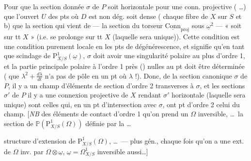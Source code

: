 \documentclass[11pt,a4paper]{article}
\begin{document}
Pour que la section donnée $\sigma$ de $P$ soit horizontale pour une conn. projective   ( \ldots) que l'ouvert $U$ des pts où $D$ est non dég. soit dense ( chaque fibre de $X$ sur $S$ et b) que la section qui vient de   \struck{\ill{}} --- la section \uncertain{\ill{}} du torseur $\underline{\mathrm{Conn}}_{\mathrm{proj}}$ sous $\underline{\omega}^2$ --- \struck{\ill{}} « soit  sur tt $X$ » (i.e. se prolonge  sur tt $X$ (laquelle sera unique)). Cette condition est une condition purement locale en les pts de  \add{\uncertain{\ill{}}} dégénérescence, et signifie qu'en tant que \struck{\ill{}} scindage de $\mathrm{P}^1_{X/S}(\underline{\omega})$, $\sigma$ \struck{\ill{}} doit avoir une singularité polaire au plus d'ordre 1, et la partie   principale polaire à l'ordre 1 près (\uncertain{\ill{}}) \uncertain{\ill{}}  nulles au pt  doit être déterminée ( que $\lambda^2 + \frac{d\lambda}{dt}$ n'a pas de pôle en un pt où $\lambda$ \struck{\ill{}}  !). Donc,   de la section canonique $\sigma$ de $P$, il y a un champ d'éléments de section d'ordre 2 transverses à $\sigma$, et les sections $\sigma'$ de $P$   il y a une connexion projective de $X$ rendant $\sigma'$ horizontale (laquelle sera unique) sont celles qui, en un pt  d'intersection avec $\sigma$, ont  pt d'ordre 2 celui du champ. [\emph{NB} des éléments de contact  d'ordre 1      qu'on prend un $\Omega$ inversible, \ldots\ la section de $\mathbb{P}(\mathrm{P}^1_{X/S}(\Omega))$ définie par la \ldots
{}

structure d'extension de $\mathrm{P}^1_{X/S}(\Omega)$, \ldots\ --- plus gén., chaque fois qu'on a une ext. de $\Omega$ inv. par $\Omega\otimes\underline{\omega}$, $\underline{\omega} = \Omega^1_{X/S}$ inversible aussi\ldots]
\end{document}
